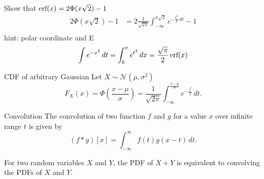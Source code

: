 \begin{exec}
  Show that $\operatorname{\text{erf}}(x)=2\Phi(x\sqrt{2})-1$
  \tcblower
  \TODO
  \begin{align*}
    2\Phi(x\sqrt{2})-1
    &= 2\frac{1}{\sqrt{2\pi}}\int_{-\infty}^{x\sqrt{2}}e^{-\frac{t^2}{2}\,dt}-1\\
  \end{align*}
  \TODO hint: polar coordinate and E
  \begin{equation*}
    \int e^{-x^2}\,dt = \int_{0}^{x} e^{t^2}\,dx = \frac{\sqrt{\pi}}{2}\operatorname{\text{erf}}(x)
  \end{equation*}
\end{exec}

\begin{fact}{CDF of arbitrary Gaussian}{}
  Let $X\sim \mathcal{N}(\mu, \sigma^2)$
  \begin{equation*}
    F_X(x)=\Phi(\frac{x-\mu}{\sigma}) = \frac{1}{\sqrt{2\pi}}\int_{-\infty}^{\frac{x-\mu}{\sigma}} e^{-\frac{t^2}{2}}\,dt.
  \end{equation*}
\end{fact}

\begin{fact}{Convolution}{}
  The convolution of two function $f$ and $g$ for a value $x$ over infinite range $t$ is given by
  \begin{equation*}
    (f*g)[x] = \int_{-\infty}^{\infty}f(t)g(x-t)\,dt.
  \end{equation*}
\end{fact}

For two random variables $X$ and $Y$, the PDF of $X+Y$ is equivalent to convolving the PDFs of $X$ and $Y$.
